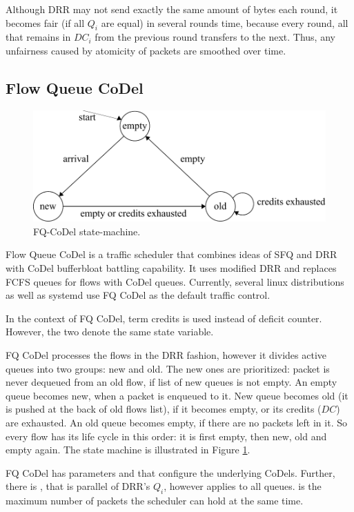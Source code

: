 Although DRR may not send exactly the same amount of bytes each round, it becomes fair (if all $Q_i$ are equal) in several rounds time, because every round, all that remains in $DC_i$ from the previous round transfers to the next. Thus, any unfairness caused by atomicity of packets are smoothed over time.

\subsection{Flow Queue CoDel}

\begin{figure}
	\centering
	\includegraphics[width=137mm]{drawings/fq_codel}
	\caption{FQ-CoDel state-machine.}
	\label{fig06:fqcodel}
\end{figure}

Flow Queue CoDel \cite{fq_codel} is a traffic scheduler that combines ideas of SFQ and DRR with CoDel bufferbloat battling capability. It uses modified DRR and replaces FCFS queues for flows with CoDel queues. Currently, several linux distributions as well as systemd use FQ CoDel as the default traffic control.

In the context of FQ CoDel, term credits is used instead of deficit counter. However, the two denote the same state variable.

FQ CoDel processes the flows in the DRR fashion, however it divides active queues into two groups: new and old. The new ones are prioritized: packet is never dequeued from an old flow, if list of new queues is not empty. An empty queue becomes new, when a packet is enqueued to it. New queue becomes old (it is pushed at the back of old flows list), if it becomes empty, or its credits ($DC$) are exhausted. An old queue becomes empty, if there are no packets left in it. So every flow has its life cycle in this order: it is first empty, then new, old and empty again. The state machine is illustrated in Figure \ref{fig06:fqcodel}.

FQ CoDel has parameters  and  that configure the underlying CoDels. Further, there is , that is parallel of DRR's $Q_i$, however  applies to all queues.  is the maximum number of packets the scheduler can hold at the same time.

